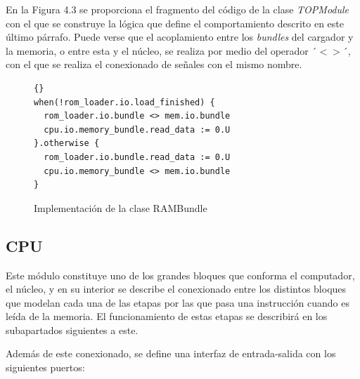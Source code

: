 En la Figura 4.3 se proporciona el fragmento del código de la clase \textit{TOPModule} con el que se construye la lógica que define el comportamiento descrito en este último párrafo. Puede verse que el acoplamiento entre los \textit{bundles} del cargador y la memoria, o entre esta y el núcleo, se realiza por medio del operador ´$<>$´, con el que se realiza el conexionado de señales con el mismo nombre.

\vspace{+0.3cm}
\begin{figure}[h]
  \centering
  \begin{minipage}{0.9\linewidth}
    \begin{lstlisting}[style=scalaStyle]{}
when(!rom_loader.io.load_finished) {
  rom_loader.io.bundle <> mem.io.bundle
  cpu.io.memory_bundle.read_data := 0.U
}.otherwise {
  rom_loader.io.bundle.read_data := 0.U
  cpu.io.memory_bundle <> mem.io.bundle
}
    \end{lstlisting}
    \caption{Implementación de la clase RAMBundle}
  \end{minipage}
\end{figure}

\subsection{CPU}

Este módulo constituye uno de los grandes bloques que conforma el computador, el núcleo, y en su interior se describe el conexionado entre los distintos bloques que modelan cada una de las etapas por las que pasa una instrucción cuando es leída de la memoria. El funcionamiento de estas etapas se describirá en los subapartados siguientes a este.

Además de este conexionado, se define una interfaz de entrada-salida con los siguientes puertos:

